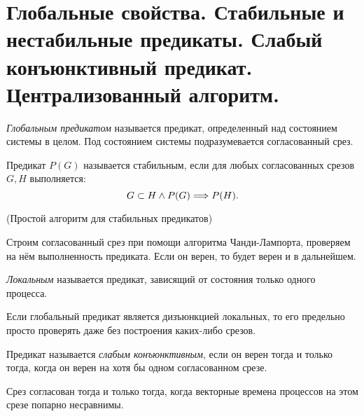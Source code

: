 \section{Глобальные свойства. Стабильные и нестабильные предикаты.
Слабый конъюнктивный предикат. Централизованный алгоритм.}

\begin{definition}
    \textit{Глобальным предикатом} называется предикат, определенный
    над состоянием системы в целом. Под состоянием системы подразумевается
    согласованный срез.
\end{definition}

\begin{definition}
    Предикат $P(G)$ называется стабильным, если для любых согласованных
    срезов $G, H$ выполняется:
    \[
        G \subset H \wedge P(G) \Longrightarrow P(H)
    .\]
\end{definition}

\begin{algorithm}(Простой алгоритм для стабильных предикатов)

    Строим согласованный срез при помощи алгоритма Чанди-Лампорта,
    проверяем на нём выполненность предиката. Если он верен, то будет
    верен и в дальнейшем.
\end{algorithm}

\begin{definition}
    \textit{Локальным} называется предикат, зависящий от состояния
    только одного процесса.
\end{definition}

\begin{remark}
    Если глобальный предикат является дизъюнкцией локальных, то его
    предельно просто проверять даже без построения каких-либо срезов.
\end{remark}

\begin{definition}
    Предикат называется \textit{слабым конъюнктивным}, если он верен
    тогда и только тогда, когда он верен на хотя бы одном согласованном срезе.
\end{definition}

\begin{theorem}
    Срез согласован тогда и только тогда, когда векторные времена процессов
    на этом срезе попарно несравнимы.
\end{theorem}

